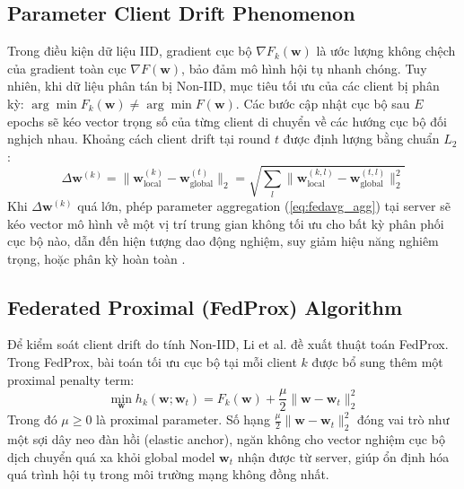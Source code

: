 \subsection{Parameter Client Drift Phenomenon}
Trong điều kiện dữ liệu IID, gradient cục bộ $\nabla F_k(\mathbf{w})$ là ước lượng không chệch của gradient toàn cục $\nabla F(\mathbf{w})$, bảo đảm mô hình hội tụ nhanh chóng. Tuy nhiên, khi dữ liệu phân tán bị Non-IID, mục tiêu tối ưu của các client bị phân kỳ: $\arg\min F_k(\mathbf{w}) \ne \arg\min F(\mathbf{w})$. Các bước cập nhật cục bộ sau $E$ epochs sẽ kéo vector trọng số của từng client di chuyển về các hướng cục bộ đối nghịch nhau. Khoảng cách client drift tại round $t$ được định lượng bằng chuẩn $L_2$:
\begin{equation}
    \Delta \mathbf{w}^{(k)} = \|\mathbf{w}_{\text{local}}^{(k)} - \mathbf{w}_{\text{global}}^{(t)}\|_2 = \sqrt{\sum_{l} \|\mathbf{w}_{\text{local}}^{(k, l)} - \mathbf{w}_{\text{global}}^{(t, l)}\|_2^2}
    \label{eq:client_drift}
\end{equation}
Khi $\Delta \mathbf{w}^{(k)}$ quá lớn, phép parameter aggregation (\ref{eq:fedavg_agg}) tại server sẽ kéo vector mô hình về một vị trí trung gian không tối ưu cho bất kỳ phân phối cục bộ nào, dẫn đến hiện tượng dao động nghiệm, suy giảm hiệu năng nghiêm trọng, hoặc phân kỳ hoàn toàn \cite{hsu2019measuring}.

\subsection{Federated Proximal (FedProx) Algorithm}
Để kiểm soát client drift do tính Non-IID, Li et al. \cite{li2020federated} đề xuất thuật toán FedProx. Trong FedProx, bài toán tối ưu cục bộ tại mỗi client $k$ được bổ sung thêm một proximal penalty term:
\begin{equation}
    \min_{\mathbf{w}} h_k(\mathbf{w}; \mathbf{w}_t) = F_k(\mathbf{w}) + \frac{\mu}{2} \|\mathbf{w} - \mathbf{w}_t\|_2^2
    \label{eq:fedprox_obj}
\end{equation}
Trong đó $\mu \ge 0$ là proximal parameter. Số hạng $\frac{\mu}{2} \|\mathbf{w} - \mathbf{w}_t\|_2^2$ đóng vai trò như một sợi dây neo đàn hồi (elastic anchor), ngăn không cho vector nghiệm cục bộ dịch chuyển quá xa khỏi global model $\mathbf{w}_t$ nhận được từ server, giúp ổn định hóa quá trình hội tụ trong môi trường mạng không đồng nhất.

